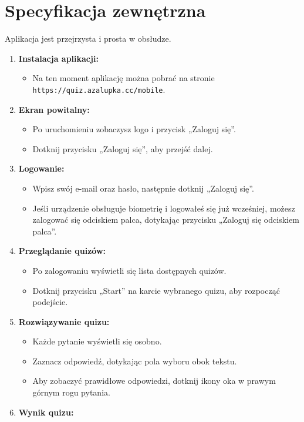 \documentclass{article}
\begin{document}
	\section{Specyfikacja zewnętrzna}
		Aplikacja jest przejrzysta i prosta w obsłudze.
		\begin{enumerate}
		\item \textbf{Instalacja aplikacji:}
			\begin{itemize}
			\item Na ten moment aplikację można pobrać na stronie \texttt{https://quiz.azalupka.cc/mobile}.
			\end{itemize}
		\item \textbf{Ekran powitalny:}
			\begin{itemize}
			\item Po uruchomieniu zobaczysz logo i przycisk „Zaloguj się”.
			\item Dotknij przycisku „Zaloguj się”, aby przejść dalej.
			\end{itemize}
		\item \textbf{Logowanie:}
			\begin{itemize}
			\item Wpisz swój e-mail oraz hasło, następnie dotknij „Zaloguj się”.
			\item Jeśli urządzenie obsługuje biometrię i logowałeś się już wcześniej, możesz zalogować się odciskiem palca, dotykając przycisku „Zaloguj się odciskiem palca”.
			\end{itemize}
		\item \textbf{Przeglądanie quizów:}
			\begin{itemize}
			\item Po zalogowaniu wyświetli się lista dostępnych quizów.
			\item Dotknij przycisku „Start” na karcie wybranego quizu, aby rozpocząć podejście.
			\end{itemize}
		\item \textbf{Rozwiązywanie quizu:}
			\begin{itemize}
			\item Każde pytanie wyświetli się osobno.
			\item Zaznacz odpowiedź, dotykając pola wyboru obok tekstu.
			\item Aby zobaczyć prawidłowe odpowiedzi, dotknij ikony oka w prawym górnym rogu pytania.
			\end{itemize}
		\item \textbf{Wynik quizu:}
			\begin{itemize}

\end{itemize}
\end{enumerate}
\end{document}
